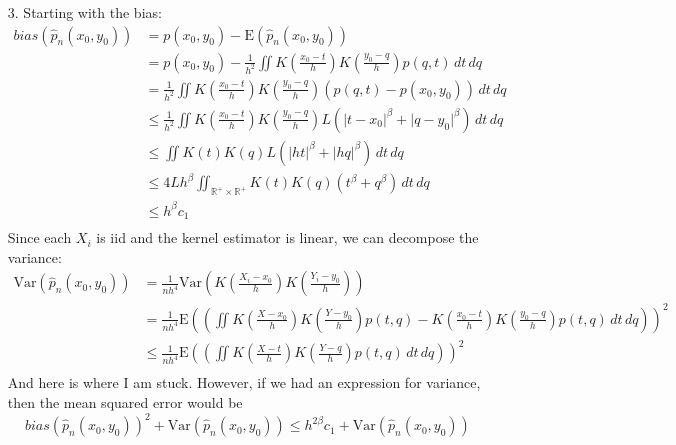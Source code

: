 \documentclass[11pt]{article}
\newcommand{\R}{\mathbb{R}}
\newcommand{\E}{\mathrm{E}}
\newcommand{\var}{\mathrm{Var}}
\theoremstyle{definition}
\begin{document}
\begin{itemize}
\begin{itemize}
        \end{itemize}
    \item[3.]
        Starting with the bias:
        \begin{align*}
            bias(\hat p_n(x_0,y_0)) &= p(x_0,y_0) - \E(\hat p_n(x_0,y_0)) \\
                                    &= p(x_0,y_0) - \frac{1}{h^2}\iint K\left(\frac{x_0-t}{h}\right)K\left(\frac{y_0-q}{h}\right)p(q,t)\,dt\,dq \\ 
                                    &= \frac{1}{h^2}\iint K\left(\frac{x_0-t}{h}\right)K\left(\frac{y_0-q}{h}\right)(p(q,t)-p(x_0,y_0))\,dt\,dq \\ 
                                    &\leq \frac{1}{h^2}\iint K\left(\frac{x_0-t}{h}\right)K\left(\frac{y_0-q}{h}\right)L(\lvert t - x_0 \rvert^\beta +\lvert q - y_0 \rvert^\beta )\,dt\,dq \\ 
                                    &\leq \iint K\left(t\right)K\left(q\right)L(\lvert ht \rvert^\beta +\lvert hq \rvert^\beta )\,dt\,dq \\ 
                                    &\leq 4Lh^\beta\iint_{\R^+\times\R^+} K\left(t\right)K\left(q\right)(t^\beta + q^\beta )\,dt\,dq \\ 
                                    &\leq h^\beta c_1\\ 
        \end{align*}
        Since each $X_i$ is iid and the kernel estimator is linear, we can decompose the variance:
        \begin{align*}
            \var\left(\hat p_n(x_0,y_0)\right) &= \frac{1}{nh^4}\var\left(K\left(\frac{X_i-x_0}{h}\right)K\left(\frac{Y_i-y_0}{h}\right)\right) \\
                                               &= \frac{1}{nh^4} \E\left(\left(\iint K\left(\frac{X-x_0}{h}\right)K\left(\frac{Y-y_0}{h}\right)p(t,q) - K\left(\frac{x_0-t}{h}\right)K\left(\frac{y_0-q}{h}\right)p(t,q)\,dt\,dq\right)\right)^2 \\
                                               &\leq \frac{1}{nh^4} \E\left(\left(\iint K\left(\frac{X-t}{h}\right)K\left(\frac{Y-q}{h}\right)p(t,q)\,dt\,dq\right)\right)^2 \\
        \end{align*}
        And here is where I am stuck. However, if we had an expression for variance, then the mean squared error would be 
        \[bias(\hat p_n(x_0,y_0))^2 + \var\left(\hat p_n(x_0,y_0)\right) \leq h^{2\beta}c_1 + \var\left(\hat p_n(x_0,y_0)\right)\]

\end{itemize}
\end{document}
